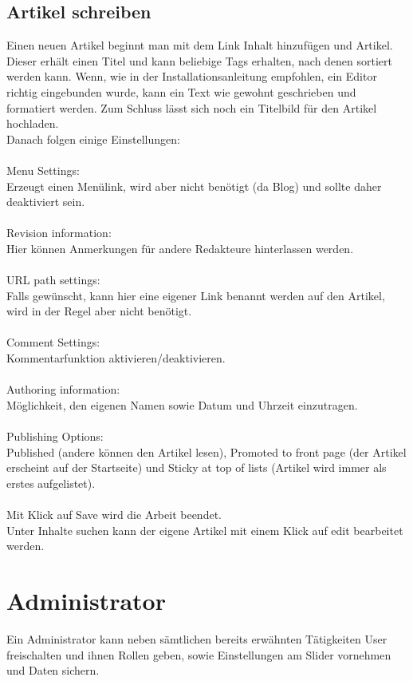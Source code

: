 \documentclass{swp}
\begin{document}
\subsection{Artikel schreiben}
Einen neuen Artikel beginnt man mit dem Link \glqq Inhalt hinzuf\"ugen\grqq{} und \glqq Artikel\grqq{}. Dieser erh\"alt einen Titel und kann beliebige \glqq Tags\grqq{} erhalten, nach denen sortiert werden kann. Wenn, wie in der Installationsanleitung empfohlen, ein Editor richtig eingebunden wurde, kann ein Text wie gewohnt geschrieben und formatiert werden. Zum Schluss l\"asst sich noch ein Titelbild f\"ur den Artikel hochladen.\\
Danach folgen einige Einstellungen:\\\\
\glqq Menu Settings\grqq{}:\\
Erzeugt einen Men\"ulink, wird aber nicht ben\"otigt (da Blog) und sollte daher deaktiviert sein.\\\\
\glqq Revision information\grqq{}:\\
Hier k\"onnen Anmerkungen f\"ur andere Redakteure hinterlassen werden.\\\\
\glqq URL path settings\grqq{}:\\
Falls gew\"unscht, kann hier eine eigener Link benannt werden auf den Artikel, wird in der Regel aber nicht ben\"otigt.\\\\
\glqq Comment Settings\grqq{}:\\
Kommentarfunktion aktivieren/deaktivieren.\\\\
\glqq Authoring information\grqq{}:\\
M\"oglichkeit, den eigenen Namen sowie Datum und Uhrzeit einzutragen.\\\\
\glqq Publishing Options\grqq{}:\\
\glqq Published\grqq{} (andere k\"onnen den Artikel lesen), \glqq Promoted to front page\grqq{} (der Artikel erscheint auf der Startseite) und \glqq Sticky at top of lists\grqq{} (Artikel wird immer als erstes aufgelistet).\\\\
Mit Klick auf \glqq Save\grqq{} wird die Arbeit beendet.\\
Unter \glqq Inhalte suchen\grqq{} kann der eigene Artikel mit einem Klick auf \glqq edit\grqq{} bearbeitet werden.
\section{Administrator}
Ein Administrator kann neben s\"amtlichen bereits erw\"ahnten T\"atigkeiten User freischalten und ihnen Rollen geben, sowie Einstellungen am Slider vornehmen und Daten sichern.
\end{document}
